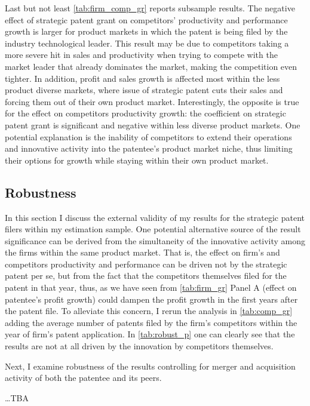 \documentclass[11pt]{article}
\begin{document}
Last but not least  \autoref{tab:firm_comp_gr} reports subsample results. The negative effect of strategic patent grant on competitors’ productivity and performance growth is larger for product markets in which the patent is being filed by the industry technological leader. This result may be due to competitors taking a more severe hit in sales and productivity when trying to compete with the market leader that already dominates the market, making the competition even tighter. In addition, profit and sales growth is affected most within the less product diverse markets, where issue of strategic patent cuts their sales and forcing them out of their own product market. Interestingly, the opposite is true for the effect on competitors productivity growth: the coefficient on strategic patent grant is significant and negative within less diverse product markets. One potential explanation is the inability of competitors to extend their operations and innovative activity into the patentee’s product market niche, thus limiting their options for growth while staying within their own product market.

\subsection{Robustness}
In this section I discuss the external validity of my results for the strategic patent filers within my estimation sample. 
One potential alternative source of the result significance can be derived from the simultaneity of the innovative activity among the firms within the same product market. That is, the effect on firm’s and competitors productivity and performance can be driven not by the strategic patent per se, but from the fact that the competitors themselves filed for the patent in that year, thus, as we have seen from \autoref{tab:firm_gr} Panel A (effect on patentee’s profit growth) could dampen the profit growth in the first years after the patent file. To alleviate this concern, I rerun the analysis in \autoref{tab:comp_gr} adding the average number of patents filed by the firm’s competitors within the year of firm’s patent application. In  \autoref{tab:robust_p} one can clearly see that the results are not at all driven by the innovation by competitors themselves. 

Next, I examine robustness of the results controlling for merger and acquisition activity of both the patentee and its peers. 

\color{red}…TBA\color{black}
\end{document}
